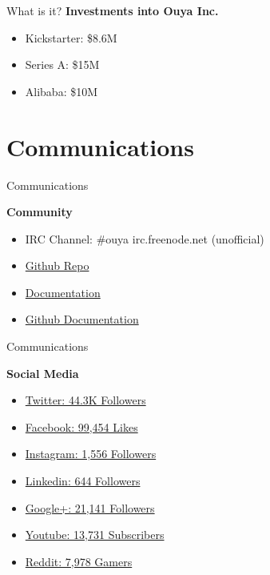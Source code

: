 \documentclass[10pt, compress]{beamer}
\begin{document}
    \begin{frame}{What is it?}
    \textbf{Investments into Ouya Inc.}
    \begin{itemize}
    \item Kickstarter: \$8.6M
    \item Series A: \$15M
    \item Alibaba: \$10M
    \end{itemize}
    \end{frame}

\section{Communications}

\begin{frame}{Communications}

\textbf{Community}
\begin{itemize}
\item IRC Channel: \#ouya irc.freenode.net (unofficial)
\item \href{https://github.com/ouya}{\alert{Github Repo}}
\item \href{https://devs.ouya.tv/developers/docs}{\alert{Documentation}}
\item \href{https://github.com/ouya/docs}{\alert{Github Documentation}}
\end{itemize}

\end{frame}

\begin{frame}{Communications}

\textbf{Social Media}
\begin{itemize}
\item \href{https://twitter.com/playouya}{\alert{Twitter: 44.3K Followers}}
\item \href{https://www.facebook.com/OUYA}{\alert{Facebook: 99,454 Likes}}
\item \href{https://instagram.com/OUYA/}{\alert{Instagram: 1,556 Followers}}
\item \href{https://www.linkedin.com/company/ouya-inc-}{\alert{Linkedin: 644 Followers}}
\item \href{https://plus.google.com/+OuyaTv/posts}{\alert{Google+: 21,141 Followers}}
\item \href{https://www.youtube.com/user/ouyas}{\alert{Youtube: 13,731 Subscribers}}
\item \href{http://www.reddit.com/r/ouya}{\alert{Reddit: 7,978 Gamers}} 
\end{itemize}

\end{frame}
\end{document}
